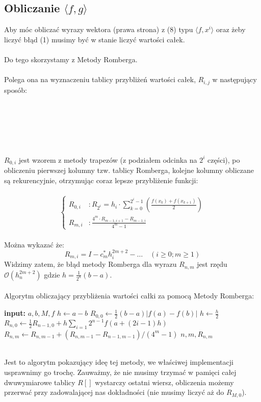 \documentclass{article}
\begin{document}
\subsection*{Obliczanie $\langle f, g\rangle$}
Aby móc obliczać wyrazy wektora (prawa strona) z (8) typu $\langle f,x^i \rangle$ oraz żeby liczyć błąd (1) musimy być w stanie liczyć wartości całek.\\\\
Do tego skorzystamy z Metody Romberga.\\\\
Polega ona na wyznaczeniu tablicy przybliżeń wartości całek, $R_{i,j}$ w następujący sposób:\\\\\\\\\\\\\\
$R_{0,i}$ jest wzorem z metody trapezów (z podziałem odcinka na $2^i$ części), po obliczeniu pierwszej kolumny tzw. tablicy Romberga, kolejne kolumny obliczane są rekurencyjnie, otrzymując coraz lepsze przybliżenie funkcji:\\\\
\begin{equation}
\begin{cases}
\displaystyle R_{0,i} &: R_{2^i}=h_i\cdot \displaystyle \sum_{k=0}^{2^i-1}\left(\frac{f(x_k)+f(x_{k+1})}{2}\right) \\
\displaystyle R_{m,i} &: \displaystyle \frac{4^m\cdot R_{m-1,i+1}-R_{m-1,i}}{4^m-1}
\end{cases}
\end{equation}
\\Można wykazać że:
$$
R_{m,i} = I - c^*_mh_i^{2m+2}- \ldots \quad (i\geq0 ; m\geq 1)
$$
Widzimy zatem, że błąd metody Romberga dla wyrazu $R_{n,m}$ jest rzędu $\mathcal{O}(h_n^{2m+2})$ gdzie $h = \frac{1}{2^n}(b-a)$.\\\\
Algorytm obliczający przybliżenia wartości całki za pomocą Metody Romberga:
\begin{algorithm}
\begin{algorithmic}
\STATE \textbf{input:} $a,b,M,f$
\STATE $h \leftarrow a-b$
\STATE $R_{0,0} \leftarrow \frac{1}{2}(b-a)|f(a)-f(b)|$
    \STATE $h \leftarrow \frac{h}{2}$
    \STATE $R_{n,0} \leftarrow \frac{1}{2} R_{n-1,0} + h\sum_{i=1}{2^{n-1}}f(a+(2i-1)h)$
        \STATE $R_{n,m} \leftarrow R_{n,m-1} + (R_{n,m-1} - R_{n-1,m-1}) / (4^m-1)$
        \PRINT $n,m,R_{n,m}$
    \ENDFOR
\ENDFOR
\end{algorithmic}
\end{algorithm}
\\
Jest to algorytm pokazujący ideę tej metody, we właściwej implementacji usprawnimy go trochę. Zauważmy, że nie musimy trzymać w pamięci całej dwuwymiarowe tablicy $R[]$ wystarczy ostatni wiersz, obliczenia możemy przerwać przy zadowalającej nas dokładności (nie musimy liczyć aż do $R_{M,0}$).
\end{document}
